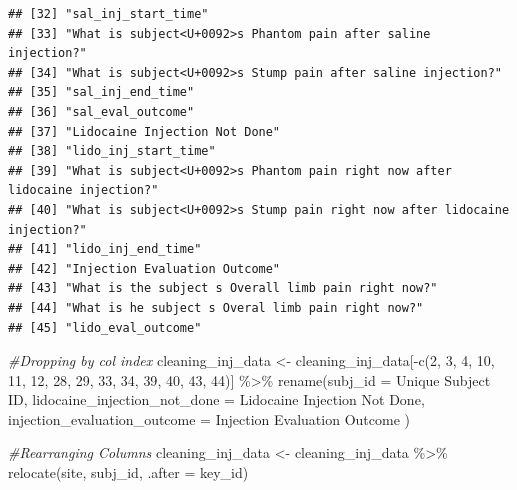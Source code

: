 \documentclass[
]{article}
\newenvironment{Shaded}{\begin{snugshade}}{\end{snugshade}}
\newcommand{\AttributeTok}[1]{\textcolor[rgb]{0.77,0.63,0.00}{#1}}
\newcommand{\CommentTok}[1]{\textcolor[rgb]{0.56,0.35,0.01}{\textit{#1}}}
\newcommand{\DecValTok}[1]{\textcolor[rgb]{0.00,0.00,0.81}{#1}}
\newcommand{\FunctionTok}[1]{\textcolor[rgb]{0.00,0.00,0.00}{#1}}
\newcommand{\NormalTok}[1]{#1}
\newcommand{\OtherTok}[1]{\textcolor[rgb]{0.56,0.35,0.01}{#1}}
\newcommand{\SpecialCharTok}[1]{\textcolor[rgb]{0.00,0.00,0.00}{#1}}
\newcommand{\StringTok}[1]{\textcolor[rgb]{0.31,0.60,0.02}{#1}}
\begin{document}
\begin{verbatim}
## [32] "sal_inj_start_time"                                                      
## [33] "What is subject<U+0092>s Phantom pain after saline injection?"           
## [34] "What is subject<U+0092>s Stump pain after saline injection?"             
## [35] "sal_inj_end_time"                                                        
## [36] "sal_eval_outcome"                                                        
## [37] "Lidocaine Injection Not Done"                                            
## [38] "lido_inj_start_time"                                                     
## [39] "What is subject<U+0092>s Phantom pain right now after lidocaine injection?"
## [40] "What is subject<U+0092>s Stump pain right now after lidocaine injection?"
## [41] "lido_inj_end_time"                                                       
## [42] "Injection Evaluation Outcome"                                            
## [43] "What is the subject s Overall limb pain right now?"                      
## [44] "What is he subject s Overal limb pain right now?"                        
## [45] "lido_eval_outcome"
\end{verbatim}

\begin{Shaded}
\begin{Highlighting}[]
\CommentTok{\#Dropping by col index}
\NormalTok{cleaning\_inj\_data }\OtherTok{\textless{}{-}}\NormalTok{ cleaning\_inj\_data[}\SpecialCharTok{{-}}\FunctionTok{c}\NormalTok{(}\DecValTok{2}\NormalTok{, }\DecValTok{3}\NormalTok{, }\DecValTok{4}\NormalTok{, }\DecValTok{10}\NormalTok{, }\DecValTok{11}\NormalTok{, }\DecValTok{12}\NormalTok{, }\DecValTok{28}\NormalTok{, }\DecValTok{29}\NormalTok{, }\DecValTok{33}\NormalTok{, }\DecValTok{34}\NormalTok{, }\DecValTok{39}\NormalTok{, }\DecValTok{40}\NormalTok{, }\DecValTok{43}\NormalTok{, }\DecValTok{44}\NormalTok{)] }\SpecialCharTok{\%\textgreater{}\%} \FunctionTok{rename}\NormalTok{(}\AttributeTok{subj\_id =} \StringTok{\textasciigrave{}}\AttributeTok{Unique Subject ID}\StringTok{\textasciigrave{}}\NormalTok{,}
                \AttributeTok{lidocaine\_injection\_not\_done =} \StringTok{\textasciigrave{}}\AttributeTok{Lidocaine Injection Not Done}\StringTok{\textasciigrave{}}\NormalTok{,}
                \AttributeTok{injection\_evaluation\_outcome =} \StringTok{\textasciigrave{}}\AttributeTok{Injection Evaluation Outcome}\StringTok{\textasciigrave{}}
\NormalTok{                ) }

\CommentTok{\#Rearranging Columns}
\NormalTok{cleaning\_inj\_data }\OtherTok{\textless{}{-}}\NormalTok{ cleaning\_inj\_data }\SpecialCharTok{\%\textgreater{}\%} 
  \FunctionTok{relocate}\NormalTok{(site, subj\_id, }\AttributeTok{.after =}\NormalTok{ key\_id)}
\end{Highlighting}
\end{Shaded}
\end{document}
